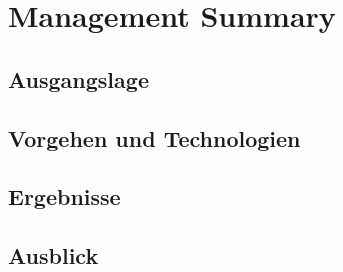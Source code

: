 \section{Management Summary}

\subsection{Ausgangslage}

\subsection{Vorgehen und Technologien}

\subsection{Ergebnisse}

\subsection{Ausblick}
